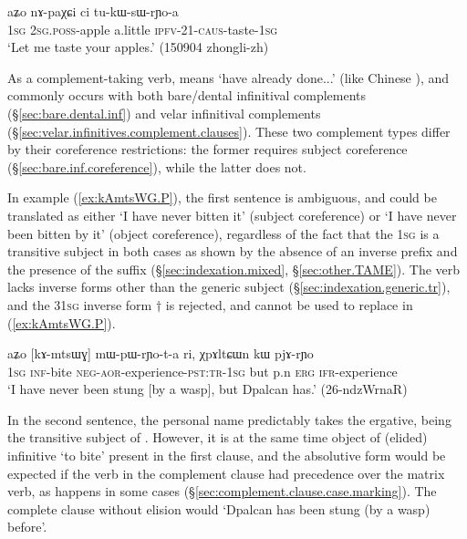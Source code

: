 \begin{exe}
\ex \label{ex:tukWsWrYoa}
 \gll aʑo nɤ-paχɕi ci tu-kɯ-sɯ-rɲo-a \\
 \textsc{1sg} \textsc{2sg}.\textsc{poss}-apple a.little \textsc{ipfv}-2\fl{}1-\textsc{caus}-taste-\textsc{1sg} \\
 \glt `Let me taste your apples.' (150904 zhongli-zh)
\end{exe}    
    
As a com\-ple\-ment-taking verb,  means `have already done...' (like Chinese  ), and commonly occurs with both bare/dental infinitival complements (§\ref{sec:bare.dental.inf}) and velar infinitival complements (§\ref{sec:velar.infinitives.complement.clauses}). These two complement types differ by their coreference restrictions: the former requires subject coreference (§\ref{sec:bare.inf.coreference}), while the latter does not.


In example (\ref{ex:kAmtsWG.P}), the first sentence  is ambiguous, and could be translated as either `I have never bitten it' (subject coreference) or `I have never been bitten by it' (object coreference), regardless of the fact that the \textsc{1sg} is a transitive subject in both cases as shown by the absence of an inverse prefix and the presence of the  suffix (§\ref{sec:indexation.mixed}, §\ref{sec:other.TAME}). The verb  lacks inverse forms other than the generic subject (§\ref{sec:indexation.generic.tr}), and the 3\fl{}\textsc{1sg} inverse form $\dagger$ is rejected, and cannot be used to replace   in (\ref{ex:kAmtsWG.P}).

\begin{exe}
\ex   \label{ex:kAmtsWG.P} 
\gll aʑo [kɤ-mtsɯɣ] mɯ-pɯ-rɲo-t-a ri, χpɤltɕɯn kɯ pjɤ-rɲo  \\
\textsc{1sg} \textsc{inf}-bite \textsc{neg}-\textsc{aor}-experience-\textsc{pst}:\textsc{tr}-\textsc{1sg} but p.n \textsc{erg}  \textsc{ifr}-experience \\
\glt `I have never been stung [by a wasp], but Dpalcan has.' (26-ndzWrnaR) 
\end{exe}  
 
In the second sentence, the personal name  predictably takes the ergative, being the transitive subject of . However, it is at the same time object of (elided) infinitive  `to bite' present in the first clause, and the absolutive form would be expected if the verb in the complement clause had precedence over the matrix verb, as happens in some cases (§\ref{sec:complement.clause.case.marking}). The complete clause without elision would  `Dpalcan has been stung (by a wasp) before'.



